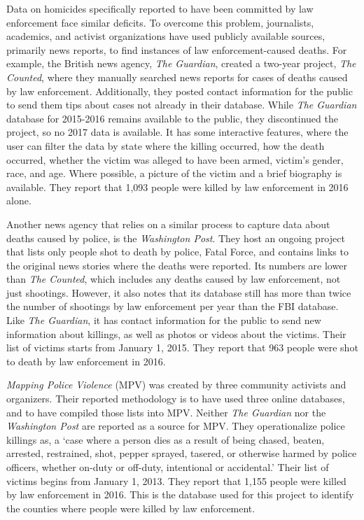 \documentclass[sigconf]{acmart}
\begin{document}
Data on homicides specifically reported to have been committed by law enforcement face similar deficits. \cite{currie16,pridemore05,nix17}  To overcome this problem, journalists, academics, and activist organizations have used publicly available sources, primarily news reports, to find instances of law enforcement-caused deaths.  For example, the British news agency, {\em The Guardian}, created a two-year project, {\em The Counted}, where they manually searched news reports for cases of deaths caused by law enforcement. \cite{counted}  Additionally, they posted contact information for the public to send them tips about cases not already in their database.  While {\em The Guardian} database for 2015-2016 remains available to the public, they discontinued the project, so no 2017 data is available.  It has some interactive features, where the user can filter the data by state where the killing occurred, how the death occurred, whether the victim was alleged to have been armed, victim's gender, race, and age.  Where possible, a picture of the victim and a brief biography is available.  They report that 1,093 people were killed by law enforcement in 2016 alone.

Another news agency that relies on a similar process to capture data about deaths caused by police, is the {\em Washington Post}.  They host an ongoing project that lists only people shot to death by police, Fatal Force, and contains links to the original news stories where the deaths were reported. \cite{fatalforce}  Its numbers are lower than {\em The Counted}, which includes any deaths caused by law enforcement, not just shootings.  However, it also notes that its database still has more than twice the number of shootings by law enforcement per year than the FBI database.  Like {\em The Guardian}, it has contact information for the public to send new information about killings, as well as photos or videos about the victims.  Their list of victims starts from January 1, 2015.  They report that 963 people were shot to death by law enforcement in 2016.

{\em Mapping Police Violence} (MPV) was created by three community activists and organizers.  Their reported methodology is to have used three online databases, and to have compiled those lists into MPV.  Neither {\em The Guardian} nor the {\em Washington Post} are reported as a source for MPV. They operationalize police killings as, a `case where a person dies as a result of being chased, beaten, arrested, restrained, shot, pepper sprayed, tasered, or otherwise harmed by police officers, whether on-duty or off-duty, intentional or accidental.' \cite{policeviolence} Their list of victims begins from January 1, 2013.  They report that 1,155 people were killed by law enforcement in 2016.  This is the database used for this project to identify the counties where people were killed by law enforcement.
\end{document}
